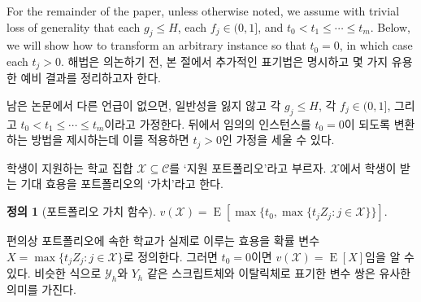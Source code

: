 \documentclass[11pt]{article} %
\newif\ifen
\theoremstyle{definition}
\newtheorem{definition}{Definition}
\theoremstyle{definition}
\newtheorem{definition}{정의}
\begin{document}
For the remainder of the paper, unless otherwise noted, we assume with trivial loss of generality that each $g_j \leq H$, each $f_j \in (0, 1]$, and $t_0 < t_1 \leq \cdots \leq t_m$. Below, we will show how to transform an arbitrary instance so that $t_0 = 0$, in which case each $t_j > 0$. 
\else
해법은 의논하기 전, 본 절에서 추가적인 표기법은 명시하고 몇 가지 유용한 예비 결과를 정리하고자 한다.

남은 논문에서 다른 언급이 없으면, 일반성을 잃지 않고 각 $g_j \leq H$, 각 $f_j \in (0, 1]$, 그리고 $t_0 < t_1 \leq \cdots \leq t_m$이라고 가정한다. 뒤에서 임의의 인스턴스를 $t_0 = 0$이 되도록 변환하는 방법을 제시하는데 이를 적용하면 $t_j > 0$인 가정을 세울 수 있다. 
\fi

\ifen
We refer to the set $\mathcal{X} \subseteq \mathcal{C}$ of schools to which a student applies as her \emph{application portfolio.} The expected utility the student receives from $\mathcal{X}$ is called its \emph{valuation}. %
\else
학생이 지원하는 학교 집합 $\mathcal{X} \subseteq \mathcal{C}$를 `지원 포트폴리오'라고 부르자. $\mathcal{X}$에서 학생이 받는 기대 효용을 포트폴리오의 `가치'라고 한다.
\fi 
\begin{definition}[\ifen Portfolio valuation function\else 포트폴리오 가치 함수\fi]
$v(\mathcal{X}) =  \operatorname{E}\left[\max\bigr\{t_0,
\max\{t_j Z_j : j \in \mathcal{X}\}\bigr\}\right]$.
\end{definition}
\ifen
It is helpful to define the random variable $X  = \max\{ t_j Z_j : j \in \mathcal{X}\}$ as the utility achieved by the schools in the portfolio, so that when $t_0 = 0$, $v(\mathcal{X}) = \operatorname{E}[X]$. Similar pairs of variables with script and italic names such as $\mathcal{Y}_h$ and $Y_h$ carry an analogous meaning.
\else
편의상 포트폴리오에 속한 학교가 실제로 이루는 효용을 확률 변수 $X  = \max\{ t_j Z_j : j \in \mathcal{X}\}$로 정의한다. 그러면 $t_0 = 0$이면 $v(\mathcal{X}) = \operatorname{E}[X]$임을 알 수 있다. 비슷한 식으로 $\mathcal{Y}_h$와 $Y_h$ 같은 스크립트체와 이탈릭체로 표기한 변수 쌍은 유사한 의미를 가진다.
\fi
\end{document}
